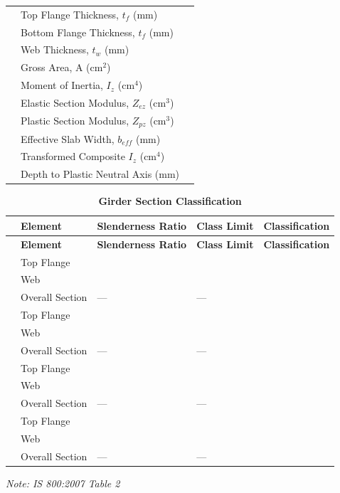 \documentclass[12pt,a4paper]{report}
\numberwithin{table}{chapter}
\numberwithin{figure}{chapter}
\begin{document}
\begin{longtable}{|C{2.5cm}|L{8.0cm}|>{\centering\arraybackslash}p{5.0cm}|}
 & \textnormal{Top Flange Thickness, $t_f$ (mm)} &  \\[6pt]
 & \textnormal{Bottom Flange Thickness, $t_f$ (mm)} &  \\[6pt]
 & \textnormal{Web Thickness, $t_w$ (mm)} &  \\[6pt]
 & \textnormal{Gross Area, A (cm$^2$)} &  \\[6pt]
 & \textnormal{Moment of Inertia, $I_z$ (cm$^4$)} &  \\[6pt]
 & \textnormal{Elastic Section Modulus, $Z_{ez}$ (cm$^3$)} &  \\[6pt]
 & \textnormal{Plastic Section Modulus, $Z_{pz}$ (cm$^3$)} &  \\[6pt]
 & \textnormal{Effective Slab Width, $b_{eff}$ (mm)} &  \\[6pt]
 & \textnormal{Transformed Composite $I_z$ (cm$^4$)} &  \\[6pt]
 & \textnormal{Depth to Plastic Neutral Axis (mm)} &  \\[6pt]
\hline
\end{longtable}

\vspace{1em}
\begin{longtable}{|C{2.5cm}|L{3cm}|C{3.5cm}|C{2.5cm}|>{\centering\arraybackslash}p{4.0cm}|}
\caption{\textbf{Girder Section Classification}}
\hline
{} \textbf{} & \textbf{Element} & \textbf{Slenderness Ratio} & \textbf{Class Limit} & \textbf{Classification} \\[6pt]
\hline
\endfirsthead
\hline
{} \textbf{} & \textbf{Element} & \textbf{Slenderness Ratio} & \textbf{Class Limit} & \textbf{Classification} \\[6pt]
\hline
\endhead
{} & Top Flange &  &  &  \\[6pt]
 & Web &  &  &  \\[6pt]
 & Overall Section & --- & --- &  \\[6pt]
\hline
{} & Top Flange &  &  &  \\[6pt]
 & Web &  &  &  \\[6pt]
 & Overall Section & --- & --- &  \\[6pt]
\hline
{} & Top Flange &  &  &  \\[6pt]
 & Web &  &  &  \\[6pt]
 & Overall Section & --- & --- &  \\[6pt]
\hline
{} & Top Flange &  &  &  \\[6pt]
 & Web &  &  &  \\[6pt]
 & Overall Section & --- & --- &  \\[6pt]
\hline
\end{longtable}
\noindent\textit{Note: IS 800:2007 Table 2}
\end{document}
